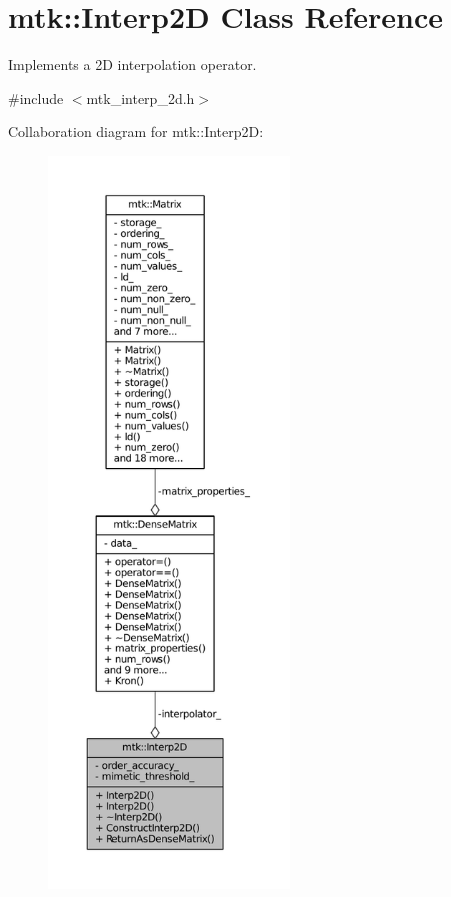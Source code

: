 \hypertarget{classmtk_1_1Interp2D}{\section{mtk\+:\+:Interp2\+D Class Reference}
\label{classmtk_1_1Interp2D}
}


Implements a 2\+D interpolation operator.  




{\ttfamily \#include $<$mtk\+\_\+interp\+\_\+2d.\+h$>$}



Collaboration diagram for mtk\+:\+:Interp2\+D\+:\nopagebreak
\begin{figure}[H]
\begin{center}
\leavevmode
\includegraphics[height=550pt]{classmtk_1_1Interp2D__coll__graph}
\end{center}
\end{figure}
